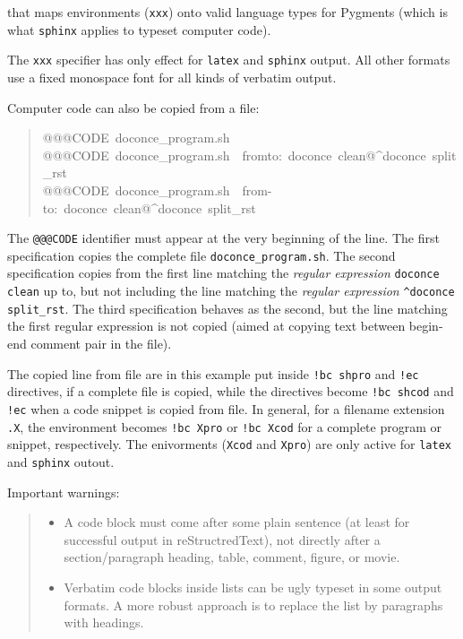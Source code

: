 \documentclass[a4paper]{article}
\begin{document}
that maps environments (\texttt{xxx}) onto valid language types for
Pygments (which is what \texttt{sphinx} applies to typeset computer code).

The \texttt{xxx} specifier has only effect for \texttt{latex} and
\texttt{sphinx} output. All other formats use a fixed monospace font for all
kinds of verbatim output.



Computer code can also be copied from a file:
%
\begin{quote}{\ttfamily \raggedright \noindent
@@@CODE~doconce\_program.sh\\
@@@CODE~doconce\_program.sh~~fromto:~doconce~clean@\textasciicircum{}doconce~split\_rst\\
@@@CODE~doconce\_program.sh~~from-to:~doconce~clean@\textasciicircum{}doconce~split\_rst
}
\end{quote}

The \texttt{@@@CODE} identifier must appear at the very beginning of the line.
The first specification copies the complete file \texttt{doconce\_program.sh}.
The second specification copies from the first line matching the \emph{regular
expression} \texttt{doconce clean} up to, but not including the line
matching the \emph{regular expression} \texttt{\textasciicircum{}doconce split\_rst}.
The third specification behaves as the second, but the line matching
the first regular expression is not copied (aimed at copying
text between begin-end comment pair in the file).

The copied line from file are in this example put inside \texttt{!bc shpro}
and \texttt{!ec} directives, if a complete file is copied, while the
directives become \texttt{!bc shcod} and \texttt{!ec} when a code snippet is copied
from file. In general, for a filename extension \texttt{.X}, the environment
becomes \texttt{!bc Xpro} or \texttt{!bc Xcod} for a complete program or snippet,
respectively. The enivorments (\texttt{Xcod} and \texttt{Xpro}) are only active
for \texttt{latex} and \texttt{sphinx} outout.

Important warnings:
%
\begin{quote}
%
\begin{itemize}

\item A code block must come after some plain sentence (at least for successful
output in reStructredText), not directly after a section/paragraph heading,
table, comment, figure, or movie.

\item Verbatim code blocks inside lists can be ugly typeset in some
output formats. A more robust approach is to replace the list by
paragraphs with headings.

\end{itemize}

\end{quote}
\end{document}

